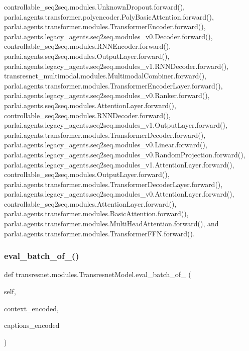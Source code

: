 controllable\+\_\+seq2seq.\+modules.\+Unknown\+Dropout.\+forward(), parlai.\+agents.\+transformer.\+polyencoder.\+Poly\+Basic\+Attention.\+forward(), parlai.\+agents.\+transformer.\+modules.\+Transformer\+Encoder.\+forward(), parlai.\+agents.\+legacy\+\_\+agents.\+seq2seq.\+modules\+\_\+v0.\+Decoder.\+forward(), controllable\+\_\+seq2seq.\+modules.\+R\+N\+N\+Encoder.\+forward(), parlai.\+agents.\+seq2seq.\+modules.\+Output\+Layer.\+forward(), parlai.\+agents.\+legacy\+\_\+agents.\+seq2seq.\+modules\+\_\+v1.\+R\+N\+N\+Decoder.\+forward(), transresnet\+\_\+multimodal.\+modules.\+Multimodal\+Combiner.\+forward(), parlai.\+agents.\+transformer.\+modules.\+Transformer\+Encoder\+Layer.\+forward(), parlai.\+agents.\+legacy\+\_\+agents.\+seq2seq.\+modules\+\_\+v0.\+Ranker.\+forward(), parlai.\+agents.\+seq2seq.\+modules.\+Attention\+Layer.\+forward(), controllable\+\_\+seq2seq.\+modules.\+R\+N\+N\+Decoder.\+forward(), parlai.\+agents.\+legacy\+\_\+agents.\+seq2seq.\+modules\+\_\+v1.\+Output\+Layer.\+forward(), parlai.\+agents.\+transformer.\+modules.\+Transformer\+Decoder.\+forward(), parlai.\+agents.\+legacy\+\_\+agents.\+seq2seq.\+modules\+\_\+v0.\+Linear.\+forward(), parlai.\+agents.\+legacy\+\_\+agents.\+seq2seq.\+modules\+\_\+v0.\+Random\+Projection.\+forward(), parlai.\+agents.\+legacy\+\_\+agents.\+seq2seq.\+modules\+\_\+v1.\+Attention\+Layer.\+forward(), controllable\+\_\+seq2seq.\+modules.\+Output\+Layer.\+forward(), parlai.\+agents.\+transformer.\+modules.\+Transformer\+Decoder\+Layer.\+forward(), parlai.\+agents.\+legacy\+\_\+agents.\+seq2seq.\+modules\+\_\+v0.\+Attention\+Layer.\+forward(), controllable\+\_\+seq2seq.\+modules.\+Attention\+Layer.\+forward(), parlai.\+agents.\+transformer.\+modules.\+Basic\+Attention.\+forward(), parlai.\+agents.\+transformer.\+modules.\+Multi\+Head\+Attention.\+forward(), and parlai.\+agents.\+transformer.\+modules.\+Transformer\+F\+F\+N.\+forward().

\mbox{\label{classtransresnet_1_1modules_1_1TransresnetModel_a1cd91f1cd051b1545683b465f7a74e12}} 
\subsubsection{\texorpdfstring{eval\+\_\+batch\+\_\+of\+\_()}{eval\_batch\_of\_100()}}
{\footnotesize\ttfamily def transresnet.\+modules.\+Transresnet\+Model.\+eval\+\_\+batch\+\_\+of\+\_ (\begin{DoxyParamCaption}\item[{}]{self,  }\item[{}]{context\+\_\+encoded,  }\item[{}]{captions\+\_\+encoded }\end{DoxyParamCaption})}


